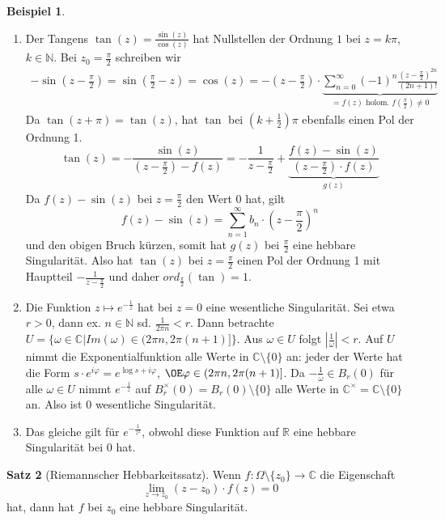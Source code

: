 \documentclass[11pt,titlepage]{article}
\theoremstyle{definition}
\newtheorem{theorem}{Satz}[section]
\newtheorem{example}[theorem]{Beispiel}
\theoremstyle{remark}
\begin{document}
	\begin{example}
		\begin{enumerate}
			\item Der Tangens $\tan(z)=\frac{\sin(z)}{\cos(z)}$ hat Nullstellen der Ordnung $1$ bei 
			$z=k\pi$, $k\in\mathbb{N}$. Bei $z_0 =\frac{\pi}{2}$ schreiben wir
			\begin{eqnarray*}
				-\sin(z-\frac{\pi}{2})=\sin(\frac{\pi}{2}-z) =\cos(z)=-(z-\frac{\pi}{2})\cdot 
				\underbrace{\sum_{n=0}^{\infty} (-1)^n \frac{(z-\frac{\pi}{2})^{2n}}{(2n+1)!}}_{=f(z)
				\text{ holom. }f(\frac{\pi}{2})\neq 0}
			\end{eqnarray*}
			Da $\tan(z+\pi)=\tan(z)$, hat $\tan$ bei $(k+\frac{1}{2})\pi$ ebenfalls einen Pol der 
			Ordnung 1.
			\[ \tan(z) =-\frac{\sin(z)}{(z-\frac{\pi}{2})-f(z)}=-\frac{1}{z-\frac{\pi}{2}}+\underbrace{ 
			\frac{f(z)-\sin(z)}{(z-\frac{\pi}{2})\cdot f(z)}}_{g(z)} \]
			Da $f(z)-\sin(z)$ bei $z=\frac{\pi}{2}$ den Wert $0$ hat, gilt
			\[ f(z)-\sin(z)=\sum_{n=1}^{\infty} b_n \cdot (z-\frac{\pi}{2})^n\]
			und den obigen Bruch kürzen, somit hat $g(z)$ bei $\frac{\pi}{2}$ eine hebbare 
			Singularität. 
			Also hat $\tan(z)$ bei $z=\frac{\pi}{2}$ einen Pol der Ordnung 1 mit Hauptteil 
			$-\frac{1}{z-\frac{\pi}{2}}$ und daher $ord_{\frac{\pi}{2}}(\tan)=1$.
			\item Die Funktion $z\mapsto e^{-\frac{1}{z}}$ hat bei $z=0$ eine wesentliche 
			Singularität. Sei etwa $r>0$, dann ex. $n\in\mathbb{N}$ sd. $\frac{1}{2\pi n}<r$. Dann 
			betrachte $U=\{ \omega\in\mathbb{C} | Im (\omega)\in (2\pi n,2\pi (n+1)]\}$. 
			Aus $\omega\in U$ folgt $|\frac{1}{\omega}|<r$. Auf $U$ nimmt die Exponentialfunktion 
			alle Werte in $\mathbb{C}\setminus\{ 0\}$ an: jeder der Werte hat die Form 
			$s\cdot e^{i\varphi}=e^{\log s+i\varphi}$, $\OE \varphi\in (2\pi n,2\pi (n+1)]$. 
			Da $-\frac{1}{\omega}\in B_r(0)$ für alle $\omega\in U$ nimmt $e^{-\frac{1}{z}}$ auf 
			$B_r^{\times}(0)=B_r(0)\setminus\{0\}$ alle Werte in $\mathbb{C}^{\times} =\mathbb{C} 
			\setminus\{0\}$ an. Also ist $0$ wesentliche Singularität.
			\item Das gleiche gilt für $e^{-\frac{1}{z^2}}$, obwohl diese Funktion auf 
			$\mathbb{R}$ eine hebbare Singularität bei $0$ hat.
		\end{enumerate}
	\end{example}
	
	\begin{theorem}[Riemannscher Hebbarkeitssatz]
		Wenn $f:\Omega\setminus\{z_0\}\to\mathbb{C}$ die Eigenschaft 
		\[\lim_{z\to z_0} (z-z_0)\cdot f(z) =0\]
		hat, dann hat $f$ bei $z_0$ eine hebbare Singularität.
	\end{theorem}
	
\end{document}
